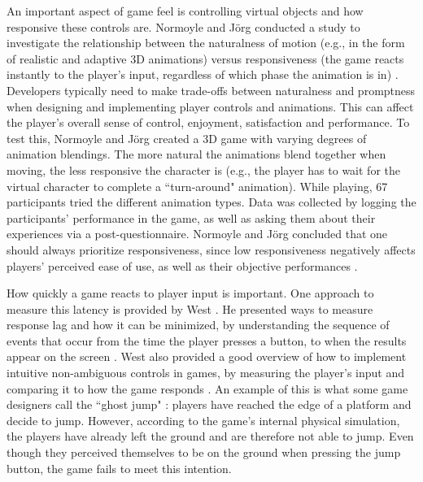 An important aspect of game feel is controlling virtual objects and how responsive these controls are. Normoyle and J\"{o}rg conducted a study to investigate the relationship between the naturalness of motion (e.g., in the form of realistic and adaptive 3D animations) versus responsiveness (the game reacts instantly to the player's input, regardless of which phase the animation is in) \cite{normoyle_trade-offs_2014}. Developers typically need to make trade-offs between naturalness and promptness when designing and implementing player controls and animations. This can affect the player's overall sense of control, enjoyment, satisfaction and performance. To test this, Normoyle and J\"{o}rg  created a 3D game with varying degrees of animation blendings. The more natural the animations blend together when moving, the less responsive the character is (e.g., the player has to wait for the virtual character to complete a ``turn-around" animation). While playing, 67 participants tried the different animation types.  Data was collected by logging the participants' performance in the game, as well as asking them about their experiences via a post-questionnaire. Normoyle and J\"{o}rg concluded that one should always prioritize responsiveness, since low responsiveness negatively affects players' perceived ease of use, as well as their objective performances \cite{normoyle_trade-offs_2014}.


How quickly a game reacts to player input is important. One approach to measure this latency is provided by West \cite{measure_lag}. He presented ways to measure response lag and how it can be minimized, by understanding the sequence of events that occur from the time the player presses a button, to when the results appear on the screen \cite{program_lag}. West also provided a good overview of how to implement intuitive non-ambiguous controls in games, by measuring the player's input and comparing it to how the game responds \cite{intuitive_buttons}. An example of this is what some game designers call the ``ghost jump" \cite{ghostJump, canabalt}: players have reached the edge of a platform and decide to jump. However, according to the game's internal physical simulation, the players have already left the ground and are therefore not able to jump. Even though they perceived themselves to be on the ground when pressing the jump button, the game fails to meet this intention.


